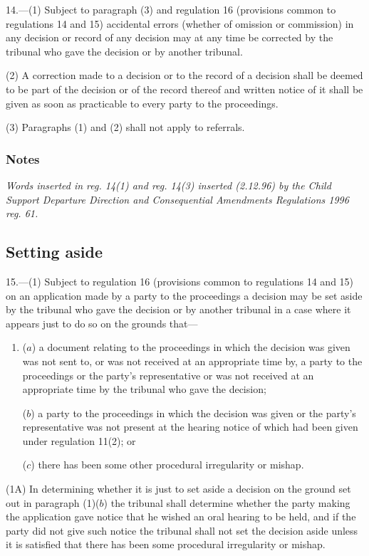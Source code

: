 \documentclass[a4paper]{article}
\newcommand\amendment[1]{\subsubsection*{Notes}{\itshape\frenchspacing\footnotesize #1 \par}}
\begin{document}
14.—(1) Subject to 
paragraph (3) and  %
regulation 16 (provisions common to regulations 14 and 15) accidental errors (whether of omission or commission) in any decision or record of any decision may at any time be corrected by the tribunal who gave the decision or by another tribunal.

(2) A correction made to a decision or to the record of a decision shall be deemed to be part of the decision or of the record thereof and written notice of it shall be given as soon as practicable to every party to the proceedings.

(3) Paragraphs (1) and (2) shall not apply to referrals.

\amendment{
Words inserted in reg. 14(1) and reg. 14(3) inserted (2.12.96) by the Child Support Departure Direction and Consequential Amendments Regulations 1996 reg. 61.
}

\subsection[15. Setting aside]{Setting aside}

15.—(1) Subject to regulation 16 (provisions common to regulations 14 and 15) on an application made by a party to the proceedings a decision may be set aside by the tribunal who gave the decision or by another tribunal in a case where it appears just to do so on the grounds that---
\begin{enumerate}\item[]
($a$) a document relating to the proceedings in which the decision was given was not sent to, or was not received at an appropriate time by, a party to the proceedings or the party’s representative or was not received at an appropriate time by the tribunal who gave the decision;

($b$) a party to the proceedings in which the decision was given or the party’s representative was not present at the hearing notice of which had been given under regulation 11(2); or

($c$) there has been some other procedural irregularity or mishap.
\end{enumerate}

(1A) In determining whether it is just to set aside a decision on the ground set out in paragraph (1)($b$) the tribunal shall determine whether the party making the application gave notice that he wished an oral hearing to be held, and if the party did not give such notice the tribunal shall not set the decision aside unless it is satisfied that there has been some procedural irregularity or mishap.
\end{document}
